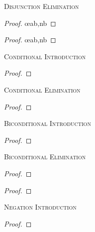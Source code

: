 \begin{multicols}{2}
\noindent\textsc{Disjunction Elimination}

\begin{proof}
	 \oe{ab,nb}
\end{proof}

\begin{proof}
	 \oe{ab,nb}
\end{proof}
\bigskip


\noindent\textsc{Conditional Introduction}

\nopagebreak
\begin{proof}
	\open
		 \as{}
	\close
\end{proof}
\bigskip


\noindent\textsc{Conditional Elimination}

\begin{proof}
	 
\end{proof}
\bigskip

\noindent\textsc{Biconditional Introduction}

\begin{proof}
	\open
		 \as{}
	\close
	\open
		 \as{}
	\close
\end{proof}
\bigskip


\noindent\textsc{Biconditional Elimination}

\begin{proof}
	 
\end{proof}

\begin{proof}
	 
\end{proof}
\bigskip


\noindent\textsc{Negation Introduction}

\begin{proof}
	\open
		 \as{}
	\close
\end{proof}
\bigskip



\end{multicols}
